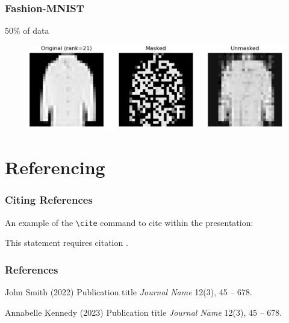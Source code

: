 \documentclass[
	11pt, %
]{beamer}
\begin{document}
\begin{frame}
	\frametitle{Fashion-MNIST}
	$50 \%$ of data
	\begin{figure}
		\centering
		\includegraphics[scale=.2]{assets/mc_ex2_orig.jpg}
	\end{figure}
\end{frame}





\section{Referencing}

\begin{frame}
	\frametitle{Citing References}
	
	An example of the \texttt{\textbackslash cite} command to cite within the presentation:
	
	\bigskip %
	
	This statement requires citation \cite{p1,p2}.
\end{frame}


\begin{frame} %
	\frametitle{References}
	
	\begin{thebibliography}{99} %
		\footnotesize %
		
			John Smith (2022)
			\newblock Publication title
			\newblock \emph{Journal Name} 12(3), 45 -- 678.
			
			Annabelle Kennedy (2023)
			\newblock Publication title
			\newblock \emph{Journal Name} 12(3), 45 -- 678.
	\end{thebibliography}
\end{frame}
\end{document}
